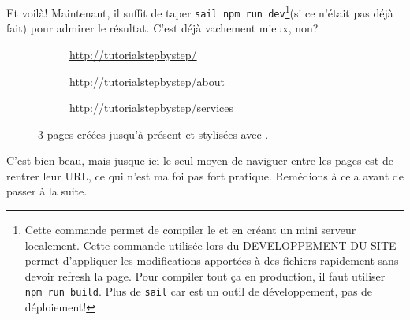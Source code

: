 \newpage

Et voilà! Maintenant, il suffit de taper \verb|sail npm run dev|\footnote{Cette commande permet de compiler le \css{} et \js{} en créant un mini serveur localement. Cette commande utilisée lors du \underline{DEVELOPPEMENT DU SITE} permet d'appliquer les modifications apportées à des fichiers rapidement sans devoir refresh la page. Pour compiler tout ça en production, il faut utiliser \verb|npm run build|. Plus de \verb|sail| car \laravelsail{} est un outil de développement, pas de déploiement!}(si ce n'était pas déjà fait) pour admirer le résultat. C'est déjà vachement mieux, non?

\begin{figure}[!h]
    \begin{subfigure}[c]{0.73\textwidth}
    \end{subfigure}\hfill
    \begin{subfigure}[c]{0.24\textwidth}
        \caption{\url{http://tutorialstepbystep/}} 
    \end{subfigure}
    \begin{subfigure}[c]{0.73\textwidth}
    \end{subfigure}\hfill
    \begin{subfigure}[c]{0.24\textwidth}
        \caption{\url{http://tutorialstepbystep/about}} 
    \end{subfigure}
    \begin{subfigure}[c]{0.73\textwidth}
    \end{subfigure}\hfill
    \begin{subfigure}[c]{0.24\textwidth}
        \caption{\url{http://tutorialstepbystep/services}} 
    \end{subfigure}
    \caption{3 pages créées jusqu'à présent et stylisées avec \bs{}.}
\end{figure}
C'est bien beau, mais jusque ici le seul moyen de naviguer entre les pages est de rentrer leur URL, ce qui n'est ma foi pas fort pratique. Remédions à cela avant de passer à la suite.


